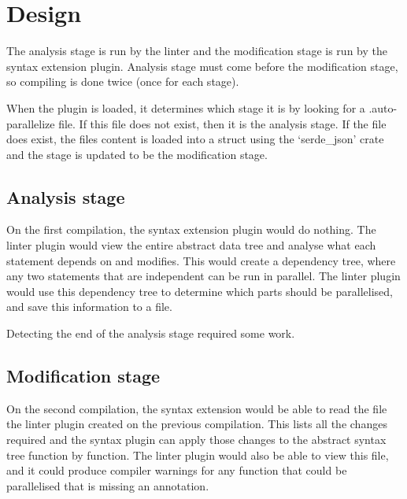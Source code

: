 \documentclass[conference]{IEEEtran}
\begin{document}
\section{Design}
The analysis stage is run by the linter and the modification stage is run by the syntax extension plugin. Analysis stage must come before the modification stage, so compiling is done twice (once for each stage).

When the plugin is loaded, it determines which stage it is by looking for a .auto-parallelize file. If this file does not exist, then it is the analysis stage. If the file does exist, the files content is loaded into a struct using the `serde\_json' crate and the stage is updated to be the modification stage.

\subsection{Analysis stage}
On the first compilation, the syntax extension plugin would do nothing. The linter plugin would view the entire abstract data tree and analyse what each statement depends on and modifies. This would create a dependency tree, where any two statements that are independent can be run in parallel. The linter plugin would use this dependency tree to determine which parts should be parallelised, and save this information to a file.

Detecting the end of the analysis stage required some work.

\subsection{Modification stage}
On the second compilation, the syntax extension would be able to read the file the linter plugin created on the previous compilation. This lists all the changes required and the syntax plugin can apply those changes to the abstract syntax tree function by function. The linter plugin would also be able to view this file, and it could produce compiler warnings for any function that could be parallelised that is missing an annotation.

\printbibliography
\end{document}
